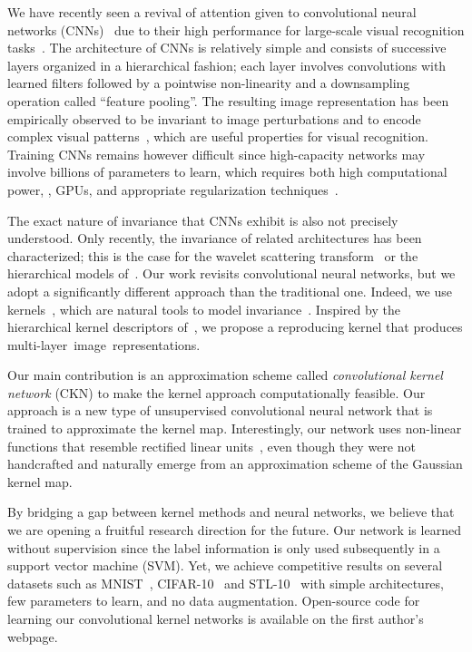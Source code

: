 We have recently seen a revival of attention given to convolutional neural
networks (CNNs)~\cite{lecun1998} due to their high performance for large-scale
visual recognition tasks~\cite{donahue2013,krizhevsky2012,wan2013}. The
architecture of CNNs is relatively simple and consists of successive layers
organized in a hierarchical fashion; each layer involves convolutions with
learned filters followed by a pointwise non-linearity and a downsampling
operation called ``feature pooling''. The resulting image representation 
has been empirically observed to be invariant to image perturbations and to
encode complex visual patterns~\cite{zeiler}, which are useful properties for
visual recognition. Training CNNs remains however difficult since high-capacity
networks may involve billions of parameters to learn, which requires both high
computational power, \eg, GPUs, and appropriate regularization
techniques~\cite{goodfellow2013,krizhevsky2012,wan2013}.

The exact nature of invariance that CNNs exhibit is also not precisely understood.
Only recently, the invariance of related architectures has been
characterized; this is the case for the wavelet scattering
transform~\cite{bruna2013} or the hierarchical models of~\cite{bou2009}.  Our
work revisits convolutional neural networks, but we adopt a significantly
different approach than the traditional one. Indeed, we use 
kernels~\cite{shawe2004}, which are natural tools to model invariance~\cite{decoste2002}.
Inspired by the hierarchical kernel descriptors of~\cite{bo2011}, we propose a
reproducing kernel that produces multi-layer~image~representations. 

Our main contribution is an approximation scheme called \emph{convolutional
kernel network} (CKN) to make the kernel approach computationally feasible. Our
approach is a new type of unsupervised convolutional neural network that is trained to approximate the
kernel map. Interestingly, our network uses non-linear functions that resemble
rectified linear units~\cite{bengio2009,wan2013}, even though they were not handcrafted
and naturally emerge from an approximation scheme of the Gaussian kernel map.

By bridging a gap between kernel methods and neural networks, we believe that
we are opening a fruitful research direction for the future. Our network is
learned without supervision since the label information is only used
subsequently in a support vector machine (SVM).  Yet, we achieve competitive
results on several datasets such as MNIST~\cite{lecun1998},
CIFAR-10~\cite{krizhevsky2009} and STL-10~\cite{coates2011} with simple
architectures, few parameters to learn, and no data augmentation.  Open-source
code for learning our convolutional kernel networks is available on the first
author's webpage.

